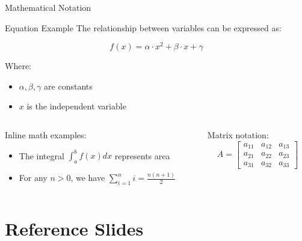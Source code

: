 \documentclass[aspectratio=169]{beamer}
\begin{document}
\begin{frame}[fragile]{Mathematical Notation}
  \begin{block}{Equation Example}
    The relationship between variables can be expressed as:
    
    \begin{equation}
      f(x) = \alpha \cdot x^2 + \beta \cdot x + \gamma
    \end{equation}
    
    Where:
    \begin{itemize}
      \item $\alpha, \beta, \gamma$ are constants
      \item $x$ is the independent variable
    \end{itemize}
  \end{block}
  
  \begin{columns}
    \begin{column}{0.48\textwidth}
      Inline math examples:
      \begin{itemize}
        \item The integral $\int_{a}^{b} f(x) dx$ represents area
        \item For any $n > 0$, we have $\sum_{i=1}^{n} i = \frac{n(n+1)}{2}$
      \end{itemize}
    \end{column}
    
    \begin{column}{0.48\textwidth}
      Matrix notation:
      \begin{equation}
        A = \begin{bmatrix}
          a_{11} & a_{12} & a_{13} \\
          a_{21} & a_{22} & a_{23} \\
          a_{31} & a_{32} & a_{33}
        \end{bmatrix}
      \end{equation}
    \end{column}
  \end{columns}
\end{frame}

\section{Reference Slides}
\end{document}
